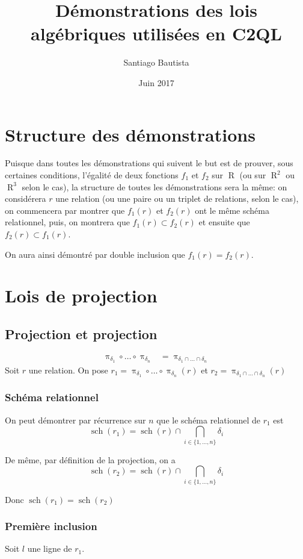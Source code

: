 \documentclass[french]{article}
\DeclareMathOperator{\proj}{\pi}
\DeclareMathOperator{\R}{R}
\DeclareMathOperator{\s}{sch}
\begin{document}
\title{Démonstrations des lois algébriques utilisées en C2QL}
\author{Santiago Bautista}
\date{Juin 2017}
\maketitle

\section*{Structure des démonstrations}
Puisque dans toutes les démonstrations qui suivent le but est 
de prouver, sous certaines conditions, l'égalité de deux fonctions $f_1$ et $f_2$
sur $\R$ (ou sur $\R^2$ ou $\R^3$ selon le cas), 
la structure de toutes les démonstrations sera la même:
on considérera $r$ une relation (ou une paire ou un triplet de relations,
selon le cas),
on commencera par montrer que $f_1(r)$ et 
$f_2(r)$ ont le même schéma relationnel,
puis, on montrera que $f_1(r) \subset f_2(r)$
et ensuite que $f_2(r) \subset f_1(r)$.

On aura ainsi démontré par double inclusion que $f_1(r) = f_2(r)$.

\section*{Lois de projection}
\subsection*{Projection et projection}
\begin{align}
\proj_{\delta_1}\circ \dots \circ \proj_{\delta_n} 
& = \proj_{\delta_1 \cap \dots \cap \delta_n}
\end{align}
Soit $r$ une relation.
On pose $r_1 = \proj_{\delta_1}\circ \dots \circ \proj_{\delta_n}(r)$ 
et $r_2 =  \proj_{\delta_1 \cap \dots \cap \delta_n}(r)$

\subsubsection*{Schéma relationnel}
On peut démontrer par récurrence sur $n$ que
le schéma relationnel de $r_1$
est 
$$
\s(r_1) = 
\s(r) \cap \bigcap_{i \in \{ 1, \dots, n \} } \delta_i
$$

De même, par définition de la projection, on a
$$
\s(r_2) = 
\s(r) \cap \bigcap_{i \in \{ 1, \dots, n \} } \delta_i
$$

Donc $\s(r_1) = \s(r_2)$

\subsubsection*{Première inclusion}
Soit $l$ une ligne de $r_1$.
\end{document}
